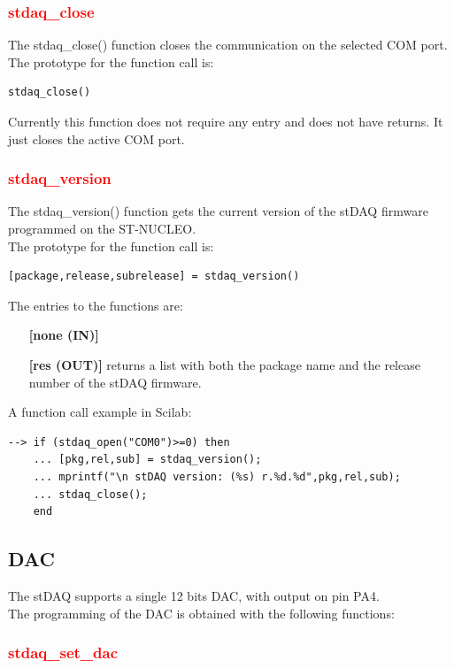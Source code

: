 \documentclass[letterpaper,10pt,english]{hitec}
\begin{document}
\subsubsection{\textcolor{red}{stdaq\_close}}

The stdaq\_close() function closes the communication on the selected COM port. \\
The prototype for the function call is:
\begin{verbatim}
stdaq_close()
\end{verbatim}
Currently this function does not require any entry and does not have returns. It just closes the active COM port.

\subsubsection{\textcolor{red}{stdaq\_version}}

The stdaq\_version() function gets the current version of the stDAQ firmware programmed on the ST-NUCLEO. \\
The prototype for the function call is:
\begin{verbatim}
[package,release,subrelease] = stdaq_version()
\end{verbatim}
The entries to the functions are:
\begin{itemize}
\item [\textbf{[none (IN)]}] 
\item [\textbf{[res (OUT)]}] returns a list with both the package name and the release number of the stDAQ firmware.
\end{itemize}
A function call example in Scilab:
\begin{verbatim}
--> if (stdaq_open("COM0")>=0) then 
    ... [pkg,rel,sub] = stdaq_version();
    ... mprintf("\n stDAQ version: (%s) r.%d.%d",pkg,rel,sub);
    ... stdaq_close();
    end
\end{verbatim}

\hrulefill

\subsection{DAC}

The stDAQ supports a single 12 bits DAC, with output on pin PA4. \\
The programming of the DAC is obtained with the following functions:

\subsubsection{\textcolor{red}{stdaq\_set\_dac}}
\end{document}
